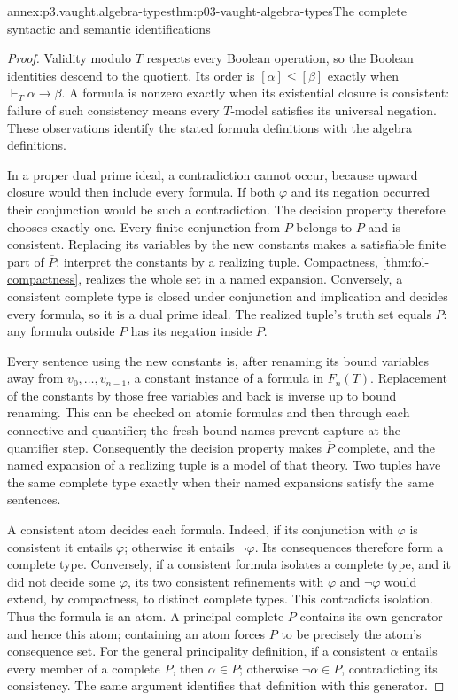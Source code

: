 \begin{annexitem}{annex:p3.vaught.algebra-types}{thm:p03-vaught-algebra-types}{The complete syntactic and semantic identifications}
\begin{proof}
Validity modulo \(T\) respects every Boolean operation, so the Boolean
identities descend to the quotient. Its order is
\([\alpha]\leq[\beta]\) exactly when \(\vdash_T\alpha\to\beta\).
A formula is nonzero exactly when its existential closure is consistent:
failure of such consistency means every \(T\)-model satisfies its
universal negation. These observations identify the stated formula
definitions with the algebra definitions.

In a proper dual prime ideal, a contradiction cannot occur, because
upward closure would then include every formula. If both \(\varphi\)
and its negation occurred their conjunction would be such a contradiction.
The decision property therefore chooses exactly one. Every finite
conjunction from \(P\) belongs to \(P\) and is consistent. Replacing its
variables by the new constants makes a satisfiable finite part of
\(\overline P\): interpret the constants by a realizing tuple.
Compactness, \cref{thm:fol-compactness}, realizes the whole set in a
named expansion. Conversely, a consistent complete type is closed
under conjunction and implication and decides every formula, so it
is a dual prime ideal. The realized tuple's truth set equals \(P\):
any formula outside \(P\) has its negation inside \(P\).

Every sentence using the new constants is, after renaming its bound
variables away from \(v_0,\ldots,v_{n-1}\), a constant instance of a
formula in \(F_n(T)\). Replacement of the constants by those free
variables and back is inverse up to bound renaming. This can be
checked on atomic formulas and then through each connective and
quantifier; the fresh bound names prevent capture at the quantifier
step. Consequently the decision property makes \(\overline P\)
complete, and the named expansion of a realizing tuple is a model
of that theory. Two tuples have the same complete type exactly when
their named expansions satisfy the same sentences.

A consistent atom decides each formula. Indeed, if its conjunction
with \(\varphi\) is consistent it entails \(\varphi\); otherwise it
entails \(\neg\varphi\). Its consequences therefore form a complete
type. Conversely, if a consistent formula isolates a complete type,
and it did not decide some \(\varphi\), its two consistent refinements
with \(\varphi\) and \(\neg\varphi\) would extend, by compactness,
to distinct complete types. This contradicts isolation. Thus the
formula is an atom. A principal complete \(P\) contains its own
generator and hence this atom; containing an atom forces \(P\) to
be precisely the atom's consequence set.
For the general principality definition, if a consistent \(\alpha\)
entails every member of a complete \(P\), then \(\alpha\in P\);
otherwise \(\neg\alpha\in P\), contradicting its consistency.
The same argument identifies that definition with this generator.


\end{proof}
\end{annexitem}
